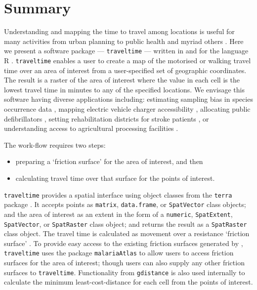 \documentclass[
  10pt,
  letterpaper,
]{article}
\providecommand{\tightlist}{%
  \setlength{\itemsep}{0pt}\setlength{\parskip}{0pt}}\usepackage{longtable,booktabs,array}
\begin{document}
\linenumbers

\section{Summary}\label{summary}

Understanding and mapping the time to travel among locations is useful
for many activities from urban planning \citep{zahavi1974traveltime} to
public health \citep{hulland2019travel, weiss2020global} and myriad
others \citep{nelson2019suite}. Here we present a software package ---
\texttt{traveltime} --- written in and for the language R \citep{Rref}.
\texttt{traveltime} enables a user to create a map of the motorised or
walking travel time over an area of interest from a user-specified set
of geographic coordinates. The result is a raster of the area of
interest where the value in each cell is the lowest travel time in
minutes to any of the specified locations. We envisage this software
having diverse applications including: estimating sampling bias in
species occurrence data \citep[@reddy2003geographical]{dennis2000bias},
mapping electric vehicle charger accessibility
\citep{falchetta2021electric}, allocating public defibrillators
\citep{tierney2018novel}, setting rehabilitation districts for stroke
patients \citep{padgham2019introduction}, or understanding access to
agricultural processing facilities \citep{zhao2023replanting}.

The work-flow requires two steps:

\begin{itemize}
\tightlist
\item
  preparing a `friction surface' for the area of interest, and then
\item
  calculating travel time over that surface for the points of interest.
\end{itemize}

\texttt{traveltime} provides a spatial interface using object classes
from the \texttt{terra} package \citep{terra}. It accepts points as
\texttt{matrix}, \texttt{data.frame}, or \texttt{SpatVector} class
objects; and the area of interest as an extent in the form of a
\texttt{numeric}, \texttt{SpatExtent}, \texttt{SpatVector}, or
\texttt{SpatRaster} class object; and returns the result as a
\texttt{SpatRaster} class object. The travel time is calculated as
movement over a resistance `friction surface' \citep{gdistance2017}. To
provide easy access to the existing friction surfaces generated by
\citet{weiss2020global}, \texttt{traveltime} uses the package
\texttt{malariaAtlas} to allow users to access friction surfaces for the
area of interest; though users can also supply any other friction
surfaces to \texttt{traveltime}. Functionality from \texttt{gdistance}
\citep{gdistance2017} is also used internally to calculate the minimum
least-cost-distance for each cell from the points of interest.
\end{document}

